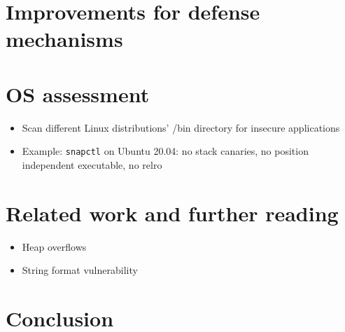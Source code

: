 \chapter{Improvements for defense mechanisms}
\label{chp:defense-mechanism-improvements}


\chapter{OS assessment}
\label{chp:os-assessment}

\begin{itemize}
	\item{Scan different Linux distributions' /bin directory for insecure applications}
	\item{Example: \texttt{snapctl} on Ubuntu 20.04: no stack canaries, no position independent executable, no \gls{relro}}
\end{itemize}
%

\chapter{Related work and further reading}
\label{chp:related-work}

\begin{itemize}
	\item{Heap overflows}
	\item{String format vulnerability}
\end{itemize}

\chapter{Conclusion}
\label{chp:conclusion}